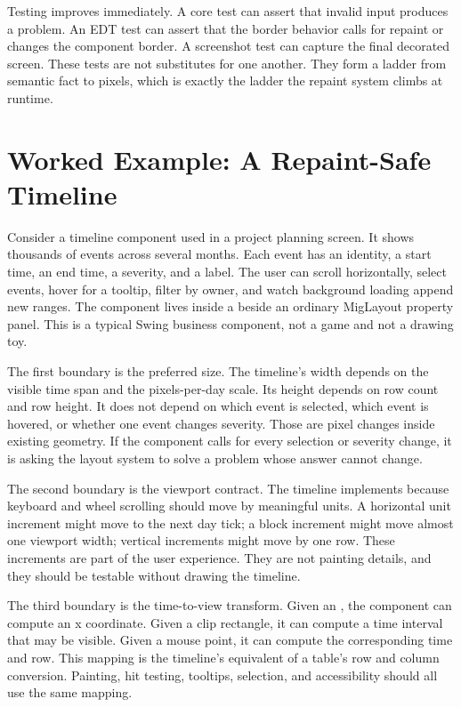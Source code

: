 Testing improves immediately. A core test can assert that invalid input produces a problem. An EDT test can assert that the border behavior calls for repaint or changes the component border. A screenshot test can capture the final decorated screen. These tests are not substitutes for one another. They form a ladder from semantic fact to pixels, which is exactly the ladder the repaint system climbs at runtime.

\section{Worked Example: A Repaint-Safe Timeline}

Consider a timeline component used in a project planning screen. It shows thousands of events across several months. Each event has an identity, a start time, an end time, a severity, and a label. The user can scroll horizontally, select events, hover for a tooltip, filter by owner, and watch background loading append new ranges. The component lives inside a  beside an ordinary MigLayout property panel. This is a typical Swing business component, not a game and not a drawing toy.

The first boundary is the preferred size. The timeline's width depends on the visible time span and the pixels-per-day scale. Its height depends on row count and row height. It does not depend on which event is selected, which event is hovered, or whether one event changes severity. Those are pixel changes inside existing geometry. If the component calls  for every selection or severity change, it is asking the layout system to solve a problem whose answer cannot change.

The second boundary is the viewport contract. The timeline implements  because keyboard and wheel scrolling should move by meaningful units. A horizontal unit increment might move to the next day tick; a block increment might move almost one viewport width; vertical increments might move by one row. These increments are part of the user experience. They are not painting details, and they should be testable without drawing the timeline.

The third boundary is the time-to-view transform. Given an , the component can compute an x coordinate. Given a clip rectangle, it can compute a time interval that may be visible. Given a mouse point, it can compute the corresponding time and row. This mapping is the timeline's equivalent of a table's row and column conversion. Painting, hit testing, tooltips, selection, and accessibility should all use the same mapping.

